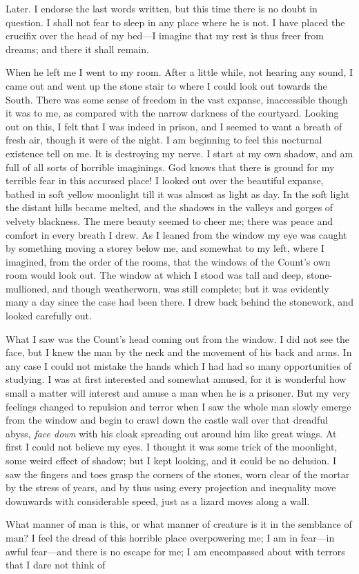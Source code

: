 \begin{diary}{Later.}
I endorse the last words written, but this time there is no doubt in question. I shall not fear to sleep in any place where he is not. I have placed the crucifix over the head of my bed—I imagine that my rest is thus freer from dreams; and there it shall remain.

When he left me I went to my room. After a little while, not hearing any sound, I came out and went up the stone stair to where I could look out towards the South. There was some sense of freedom in the vast expanse, inaccessible though it was to me, as compared with the narrow darkness of the courtyard. Looking out on this, I felt that I was indeed in prison, and I seemed to want a breath of fresh air, though it were of the night. I am beginning to feel this nocturnal existence tell on me. It is destroying my nerve. I start at my own shadow, and am full of all sorts of horrible imaginings. God knows that there is ground for my terrible fear in this accursed place! I looked out over the beautiful expanse, bathed in soft yellow moonlight till it was almost as light as day. In the soft light the distant hills became melted, and the shadows in the valleys and gorges of velvety blackness. The mere beauty seemed to cheer me; there was peace and comfort in every breath I drew. As I leaned from the window my eye was caught by something moving a storey below me, and somewhat to my left, where I imagined, from the order of the rooms, that the windows of the Count's own room would look out. The window at which I stood was tall and deep, stone-mullioned, and though weatherworn, was still complete; but it was evidently many a day since the case had been there. I drew back behind the stonework, and looked carefully out.

What I saw was the Count's head coming out from the window. I did not see the face, but I knew the man by the neck and the movement of his back and arms. In any case I could not mistake the hands which I had had so many opportunities of studying. I was at first interested and somewhat amused, for it is wonderful how small a matter will interest and amuse a man when he is a prisoner. But my very feelings changed to repulsion and terror when I saw the whole man slowly emerge from the window and begin to crawl down the castle wall over that dreadful abyss, \textit{face down} with his cloak spreading out around him like great wings. At first I could not believe my eyes. I thought it was some trick of the moonlight, some weird effect of shadow; but I kept looking, and it could be no delusion. I saw the fingers and toes grasp the corners of the stones, worn clear of the mortar by the stress of years, and by thus using every projection and inequality move downwards with considerable speed, just as a lizard moves along a wall.

What manner of man is this, or what manner of creature is it in the semblance of man? I feel the dread of this horrible place overpowering me; I am in fear—in awful fear—and there is no escape for me; I am encompassed about with terrors that I dare not think of
\end{diary}
 
